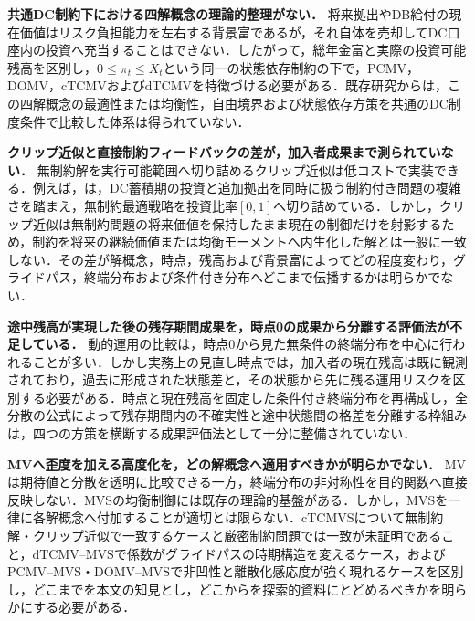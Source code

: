 \documentclass[10pt,a4paper]{article}
\theoremstyle{plain}
\theoremstyle{definition}
\begin{document}
\begin{description}[leftmargin=18mm,labelwidth=15mm,labelsep=3mm,itemsep=5pt,topsep=5pt,style=multiline]
  \item[\textbf{空白1}] \textbf{共通DC制約下における四解概念の理論的整理がない．}
  将来拠出やDB給付の現在価値はリスク負担能力を左右する背景富であるが，それ自体を売却してDC口座内の投資へ充当することはできない．したがって，総年金富と実際の投資可能残高を区別し，$0\leq\pi_t\leq X_t$という同一の状態依存制約の下で，PCMV，DOMV，cTCMVおよびdTCMVを特徴づける必要がある．既存研究からは，この四解概念の最適性または均衡性，自由境界および状態依存方策を共通のDC制度条件で比較した体系は得られていない．

  \item[\textbf{空白2}] \textbf{クリップ近似と直接制約フィードバックの差が，加入者成果まで測られていない．}
  無制約解を実行可能範囲へ切り詰めるクリップ近似は低コストで実装できる．例えば，\citet{FerreiraMoriciVigna2025}は，DC蓄積期の投資と追加拠出を同時に扱う制約付き問題の複雑さを踏まえ，無制約最適戦略を投資比率$[0,1]$へ切り詰めている．しかし，クリップ近似は無制約問題の将来価値を保持したまま現在の制御だけを射影するため，制約を将来の継続価値または均衡モーメントへ内生化した解とは一般に一致しない．その差が解概念，時点，残高および背景富によってどの程度変わり，グライドパス，終端分布および条件付き分布へどこまで伝播するかは明らかでない．

  \item[\textbf{空白3}] \textbf{途中残高が実現した後の残存期間成果を，時点0の成果から分離する評価法が不足している．}
  動的運用の比較は，時点0から見た無条件の終端分布を中心に行われることが多い．しかし実務上の見直し時点では，加入者の現在残高は既に観測されており，過去に形成された状態差と，その状態から先に残る運用リスクを区別する必要がある．時点と現在残高を固定した条件付き終端分布を再構成し，全分散の公式によって残存期間内の不確実性と途中状態間の格差を分離する枠組みは，四つの方策を横断する成果評価法として十分に整備されていない．

  \item[\textbf{空白4}] \textbf{MVへ歪度を加える高度化を，どの解概念へ適用すべきかが明らかでない．}
  MVは期待値と分散を透明に比較できる一方，終端分布の非対称性を目的関数へ直接反映しない．MVSの均衡制御には既存の理論的基盤がある\citep{MuTianYang2019}．しかし，MVSを一律に各解概念へ付加することが適切とは限らない．cTCMVSについて無制約解・クリップ近似で一致するケースと厳密制約問題では一致が未証明であること，dTCMV--MVSで係数がグライドパスの時期構造を変えるケース，およびPCMV--MVS・DOMV--MVSで非凹性と離散化感応度が強く現れるケースを区別し，どこまでを本文の知見とし，どこからを探索的資料にとどめるべきかを明らかにする必要がある．
\end{description}
\end{document}
